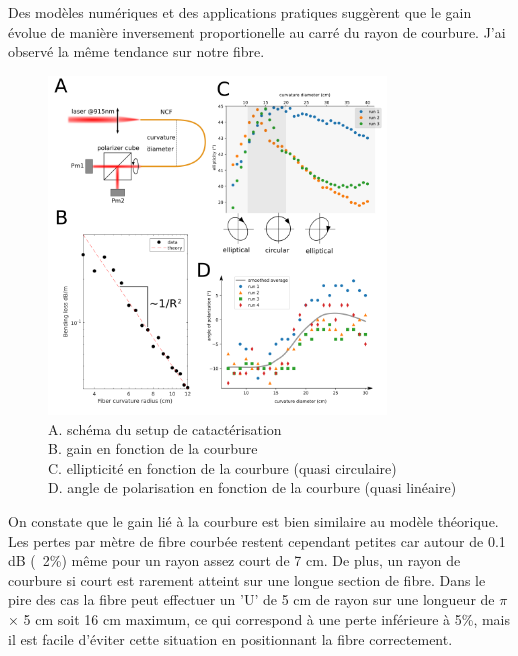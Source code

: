 
Des modèles numériques \cite{yu_negative_2016} \cite{setti_flexible_2013} et des applications pratiques suggèrent que le gain évolue de manière inversement proportionelle au carré du rayon de courbure. J'ai observé la même tendance sur notre fibre.

\begin{figure}
\centering
\includegraphics[width=0.8\textwidth]{./files/fiber_bending.png}
\caption{A. schéma du setup de catactérisation
\\ B. gain en fonction de la courbure
\\ C. ellipticité en fonction de la courbure (quasi circulaire)
\\ D. angle de polarisation en fonction de la courbure (quasi linéaire)}
\end{figure}



On constate que le gain lié à la courbure est bien similaire au modèle théorique. Les pertes par mètre de fibre courbée restent cependant petites car autour de 0.1 dB (~2\%) même pour un rayon assez court de 7 cm. De plus, un rayon de courbure si court est rarement atteint sur une longue section de fibre. Dans le pire des cas la fibre peut effectuer un 'U' de 5 cm de rayon sur une longueur de $\pi$ × 5 cm soit 16 cm maximum, ce qui correspond à une perte inférieure à 5\%, mais il est facile d'éviter cette situation en positionnant la fibre correctement. 

